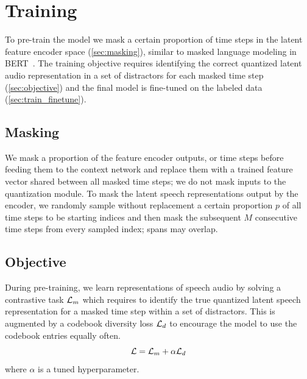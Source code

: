 \documentclass{article}
\begin{document}
\section{Training}
\label{sec:training}

To pre-train the model we mask a certain proportion of time steps in the latent feature encoder space (\autoref{sec:masking}), similar to masked language modeling in BERT~\citep{devlin2018bert}.
The training objective requires identifying the correct quantized latent audio representation in a set of distractors for each masked time step (\autoref{sec:objective}) and the final model is fine-tuned on the labeled data (\autoref{sec:train_finetune}).


\subsection{Masking}
\label{sec:masking}
We mask a proportion of the feature encoder outputs, or time steps before feeding them to the context network and replace them with a trained feature vector shared between all masked time steps;
we do not mask inputs to the quantization module.
To mask the latent speech representations output by the encoder, we randomly sample without replacement a certain proportion $p$ of all time steps to be starting indices and then mask the subsequent $M$ consecutive time steps from every sampled index; spans may overlap. 


\subsection{Objective}
\label{sec:objective}

During pre-training, we learn representations of speech audio by solving a contrastive task $\mathcal{L}_{m}{}$ which requires to identify the true quantized latent speech representation for a masked time step within a set of distractors.
This is augmented by a codebook diversity loss $\mathcal{L}_{d}{}$ to encourage the model to use the codebook entries equally often. 
\begin{equation}
    \mathcal{L} = \mathcal{L}_{m}{} + \alpha \mathcal{L}_{d}{}
\label{eq:loss}
\end{equation}
where $\alpha$ is a tuned hyperparameter.
\end{document}
